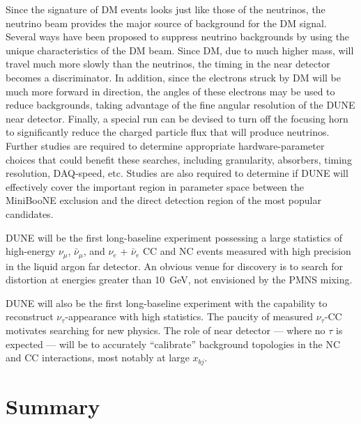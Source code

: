 Since the signature of DM events looks just like those of the
neutrinos, the neutrino beam provides the major source of background
for the DM signal. Several ways have been proposed to suppress
neutrino backgrounds by using the unique characteristics of the DM
beam. Since DM, due to much higher mass, will travel much more slowly
than the neutrinos, the timing in the near detector becomes a
discriminator.  In addition, since the electrons struck by DM will be
much more forward in direction, the angles of these electrons may be
used to reduce backgrounds, taking advantage of the fine angular
resolution of the DUNE near detector.  Finally, a special run can be
devised to turn off the focusing horn to significantly reduce the
charged particle flux that will produce neutrinos. Further studies are
required to determine appropriate hardware-parameter choices that
could benefit these searches, including granularity, absorbers, timing
resolution, DAQ-speed, etc. Studies are also required to determine if
DUNE will effectively cover the important region in parameter space
between the MiniBooNE exclusion and the direct detection region of the
most popular candidates.
 
DUNE will be the first long-baseline experiment possessing a large
statistics of high-energy $\nu_\mu$, $\bar \nu_\mu$, and $\nu_e$ +
$\bar \nu_e$ CC and NC events measured with high precision in the
liquid argon far detector. An obvious venue for discovery is to search
for distortion at energies greater than 10~GeV, not envisioned by the
PMNS mixing.

DUNE will also be the first long-baseline experiment with the capability
to reconstruct $\nu_\tau$-appearance with high statistics. The paucity
of %
measured $\nu_\tau$-CC motivates searching for new
physics.  The role of near detector --- where no $\tau$ is expected
--- will be to accurately ``calibrate'' background topologies in the
NC and CC interactions, most notably at large $x_{bj}$.


\section{Summary}
\label{sec:physics-nd-summary}



